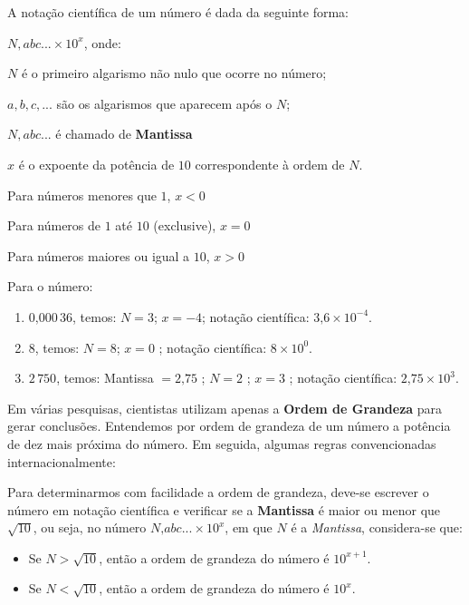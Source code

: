 A notação científica de um número é dada da seguinte forma:

$N, abc... \times 10^x$, onde:

$N$ é o primeiro algarismo não nulo que ocorre no número;

$a, b, c, ...$ são os algarismos que aparecem após o $N$;

$N, abc...$ é chamado de \textbf{Mantissa}

$x$ é o expoente da potência de $10$ correspondente à ordem de $N$.

Para números menores que $1$, $x < 0$

Para números de $1$ até $10$ (exclusive), $x = 0$

Para números maiores ou igual a $10$, $x > 0$

\begin{example}{}
Para o número:
\begin{enumerate}
\item {} 
$0\text{,}000\, 36$, temos: $N = 3$; $x = -4$; notação científica: $3\text{,}6 \times 10^{-4}$.

\item {} 
$8$, temos: $N=8$; $x=0$ ; notação científica: $8 \times 10^0$.

\item {} 
$2\, 750$, temos: Mantissa $=2\text{,}75$ ; $N=2$ ; $x=3$ ; notação científica: $2\text{,}75 \times 10^3$.

\end{enumerate}
\end{example}

Em várias pesquisas, cientistas utilizam apenas a \textbf{Ordem de Grandeza} para gerar conclusões. Entendemos por ordem de grandeza de um número a potência de dez mais próxima do número. Em seguida, algumas regras convencionadas internacionalmente:

Para determinarmos com facilidade a ordem de grandeza, deve-se escrever o número em notação científica e verificar se a \textbf{Mantissa} é maior ou menor que $\sqrt{10}$, ou seja, no número $N\text{,}abc... \times 10^x$, em que $N$ é a \emph{Mantissa}, considera-se que:
\begin{itemize}
\item {} 
Se $N > \sqrt{10}$, então a ordem de grandeza do número é $10^{x+1}$.

\item {} 
Se $N < \sqrt{10}$, então a ordem de grandeza do número é $10^x$.

\end{itemize}

